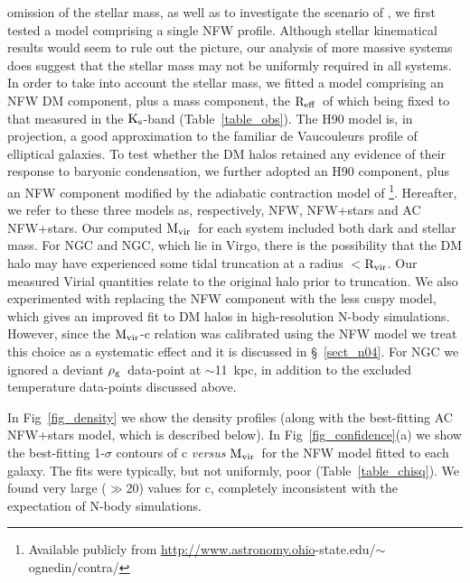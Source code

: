 \documentclass{emulateapj}
\newcommand{\rhog}{${\rm \rho_g}$}
\newcommand{\mvir}{${\rm M_{vir}}$}
\newcommand{\reff}{${\rm R_{eff}}$}
\newcommand{\ks }{${\rm K_s}$}
\newcommand{\rvir }{${\rm R_{vir}}$}
\newcommand{\thin}{\thinspace}
\begin{document}
omission of the stellar mass, as well as to investigate the 
scenario of \citet{loeb03a}, we first tested a model comprising a 
single NFW profile. Although stellar kinematical results would
seem to rule out the \citeauthor{loeb03a} picture, our analysis
of more massive systems \citep{gastaldello06a} does suggest that the
stellar mass may not be uniformly required in all systems.  
In order to take into account the stellar mass, we fitted a 
model comprising an NFW DM component, plus
a \citet[][hereafter H90]{hernquist90} mass component, the \reff\ 
of which being fixed to that measured in the \ks-band 
(Table~\ref{table_obs}). The H90 model is, in projection, a good
approximation to the familiar de Vaucouleurs profile of elliptical
galaxies.  To test whether the DM halos retained any
evidence of their response to baryonic
condensation, we further adopted an H90 component, plus an NFW component
modified by the adiabatic contraction model of \citet{gnedin04a}\footnote{Available publicly from \href{http://www.astronomy.ohio-state.edu/$\sim$ognedin/contra/}{http://www.astronomy.ohio}-state.edu/$\sim$ognedin/contra/}.
Hereafter, we refer to these three models as, respectively, NFW,
NFW+stars and AC NFW+stars. Our computed \mvir\ for each system included both
dark and stellar mass. For NGC\thin 4472 and NGC\thin 4649, which lie
in Virgo, there is the possibility that the DM halo may have experienced
some tidal truncation at a radius $<$\rvir. Our measured Virial quantities
relate to the original halo prior to truncation.
We also experimented with replacing the NFW component with the less
cuspy  \citet[][hereafter N04]{navarro04a} model, which gives 
an improved fit to DM halos in high-resolution N-body simulations.
However, since the \mvir-c relation was calibrated using
the NFW model we treat this choice as a systematic effect and it is
discussed in \S~\ref{sect_n04}.
For NGC\thin 4261 we ignored a deviant \rhog\ data-point at $\sim$11~kpc, 
in addition to the excluded temperature data-points discussed above. %

In Fig~\ref{fig_density} we show the density profiles (along with the 
best-fitting AC NFW+stars model, which is described below).
In Fig~\ref{fig_confidence}(a) we show the best-fitting 
1-$\sigma$ contours of c {\em versus} 
\mvir\ for the NFW model fitted to each galaxy. The fits were 
typically, but not uniformly, poor (Table~\ref{table_chisq}).
We found very large ($\gg$20) values for c, completely 
inconsistent with the expectation of N-body simulations.
\end{document}
